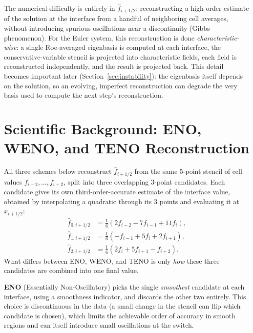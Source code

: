 \documentclass[11pt]{article}
\begin{document}
The numerical difficulty is entirely in $\hat f_{i+1/2}$: reconstructing a
high-order estimate of the solution at the interface from a handful of
neighboring cell averages, without introducing spurious oscillations near a
discontinuity (Gibbs phenomenon). For the Euler system, this reconstruction
is done \emph{characteristic-wise}: a single Roe-averaged eigenbasis is
computed at each interface, the conservative-variable stencil is projected
into characteristic fields, each field is reconstructed independently, and
the result is projected back. This detail becomes important later
(Section~\ref{sec:instability}): the eigenbasis itself depends on the
solution, so an evolving, imperfect reconstruction can degrade the very
basis used to compute the next step's reconstruction.

\section{Scientific Background: ENO, WENO, and TENO Reconstruction}
\label{sec:background-schemes}

All three schemes below reconstruct $\hat f_{i+1/2}$ from the same
5-point stencil of cell values $f_{i-2},\dots,f_{i+2}$, split into three
overlapping 3-point candidates. Each candidate gives its own
third-order-accurate estimate of the interface value, obtained by
interpolating a quadratic through its 3 points and evaluating it at
$x_{i+1/2}$:
\begin{align*}
\hat f_{0,i+1/2} &= \tfrac{1}{6}(2f_{i-2} - 7f_{i-1} + 11f_i), \\
\hat f_{1,i+1/2} &= \tfrac{1}{6}(-f_{i-1} + 5f_i + 2f_{i+1}), \\
\hat f_{2,i+1/2} &= \tfrac{1}{6}(2f_i + 5f_{i+1} - f_{i+2}).
\end{align*}
What differs between ENO, WENO, and TENO is only \emph{how} these three
candidates are combined into one final value.

\textbf{ENO} (Essentially Non-Oscillatory) picks the single
\emph{smoothest} candidate at each interface, using a smoothness
indicator, and discards the other two entirely. This choice is
discontinuous in the data (a small change in the stencil can flip which
candidate is chosen), which limits the achievable order of accuracy in
smooth regions and can itself introduce small oscillations at the switch.
\end{document}
